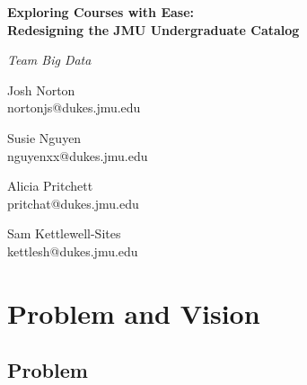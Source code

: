 \documentclass[11pt]{article}
\begin{document}

\begin{center}
\bfseries\huge
Exploring Courses with Ease: \\
Redesigning the JMU Undergraduate Catalog
\end{center}

\begin{center}
\itshape\large
Team Big Data 
\end{center}

\begin{multicols}{4}
\centering

Josh Norton \\
{\footnotesize nortonjs@dukes.jmu.edu}

Susie Nguyen \\
{\footnotesize nguyenxx@dukes.jmu.edu}

Alicia Pritchett\\
{\footnotesize pritchat@dukes.jmu.edu}

Sam Kettlewell-Sites \\
{\footnotesize kettlesh@dukes.jmu.edu}

\end{multicols}

\section*{Problem and Vision}

\subsection*{Problem}
\end{document}
